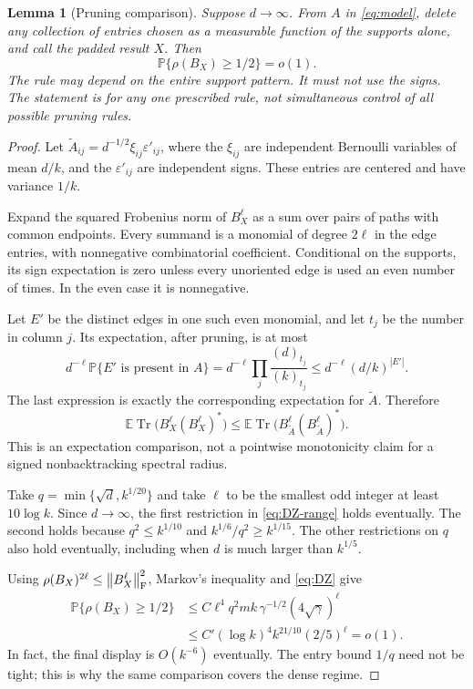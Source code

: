 \documentclass[11pt]{article}
\newtheorem{lemma}[theorem]{Lemma}
\theoremstyle{definition}
\theoremstyle{remark}
\newcommand{\PP}{\mathbb P}
\newcommand{\EE}{\mathbb E}
\newcommand{\tr}{\operatorname{Tr}}
\newcommand{\norm}[1]{\left\lVert #1\right\rVert}
\newcommand{\abs}[1]{\left\lvert #1\right\rvert}
\begin{document}
\begin{lemma}[Pruning comparison]\label{lem:pruning}
Suppose $d\to\infty$. From $A$ in \eqref{eq:model}, delete any collection of entries chosen as a measurable function of the supports alone, and call the padded result $X$. Then
\begin{equation}\label{eq:nb-radius}
 \PP\{\rho(B_X)\geq1/2\}=o(1).
\end{equation}
The rule may depend on the entire support pattern. It must not use the signs. The statement is for any one prescribed rule, not simultaneous control of all possible pruning rules.
\end{lemma}
\begin{proof}
Let $\widetilde A_{ij}=d^{-1/2}\xi_{ij}\varepsilon'_{ij}$, where the $\xi_{ij}$ are independent Bernoulli variables of mean $d/k$, and the $\varepsilon'_{ij}$ are independent signs. These entries are centered and have variance $1/k$.

Expand the squared Frobenius norm of $B_X^\ell$ as a sum over pairs of paths with common endpoints. Every summand is a monomial of degree $2\ell$ in the edge entries, with nonnegative combinatorial coefficient. Conditional on the supports, its sign expectation is zero unless every unoriented edge is used an even number of times. In the even case it is nonnegative.

Let $E'$ be the distinct edges in one such even monomial, and let $t_j$ be the number in column $j$. Its expectation, after pruning, is at most
\begin{equation}\label{eq:even-domination}
 d^{-\ell}\PP\{E'\text{ is present in }A\}
 =d^{-\ell}\prod_j\frac{(d)_{t_j}}{(k)_{t_j}}
 \leq d^{-\ell}(d/k)^{\abs{E'}}.
\end{equation}
The last expression is exactly the corresponding expectation for $\widetilde A$. Therefore
\begin{equation}\label{eq:trace-domination}
 \EE\tr\bigl(B_X^\ell(B_X^\ell)^*\bigr)
 \leq\EE\tr\bigl(B_{\widetilde A}^\ell
                         (B_{\widetilde A}^\ell)^*\bigr).
\end{equation}
This is an expectation comparison, not a pointwise monotonicity claim for a signed nonbacktracking spectral radius.

Take $q=\min\{\sqrt d,k^{1/20}\}$ and take $\ell$ to be the smallest odd integer at least $10\log k$. Since $d\to\infty$, the first restriction in \eqref{eq:DZ-range} holds eventually. The second holds because $q^2\leq k^{1/10}$ and $k^{1/6}/q^2\geq k^{1/15}$. The other restrictions on $q$ also hold eventually, including when $d$ is much larger than $k^{1/5}$.

Using $\rho(B_X)^{2\ell}\leq\norm{B_X^\ell}_{\rm F}^2$, Markov's inequality and \eqref{eq:DZ} give
\begin{align*}
 \PP\{\rho(B_X)\geq1/2\}
 &\leq C\ell^4q^2mk\,\gamma^{-1/2}
                       (4\sqrt\gamma)^\ell\\
 &\leq C'(\log k)^4 k^{21/10}(2/5)^\ell=o(1).
\end{align*}
In fact, the final display is $O(k^{-6})$ eventually. The entry bound $1/q$ need not be tight; this is why the same comparison covers the dense regime.
\end{proof}
\end{document}
